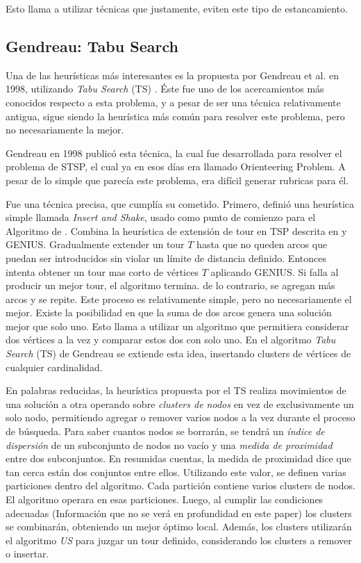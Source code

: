 \documentclass[letter, 10pt]{article}
\begin{document}
Esto llama a utilizar técnicas que justamente, eviten este tipo de estancamiento.


\subsection{Gendreau: Tabu Search}

Una de las heurísticas más interesantes es la propuesta por Gendreau et al. en 1998, utilizando \textit{Tabu Search} (TS) \cite{ProblemaTabu}. Éste fue uno de los acercamientos más conocidos respecto a esta problema, y a pesar de ser una técnica relativamente antigua, sigue siendo la heurística más común para resolver este problema, pero no necesariamente la mejor.

Gendreau en 1998 \cite{ProblemaTabu} publicó esta técnica, la cual fue desarrollada para resolver el problema de STSP, el cual ya en esos días era llamado Orienteering Problem. A pesar de lo simple que parecía este problema, era difícil generar rubricas para él. 

Fue una técnica precisa, que cumplía su cometido. Primero, definió una heurística simple llamada \textit{Insert and Shake}, usado como punto de comienzo para el Algoritmo de . Combina la heurística de extensión de tour en TSP descrita en \cite{ProblemaHerramientaParaTabuSearch} y GENIUS. Gradualmente extender un tour $T$ hasta que no queden arcos que puedan ser introducidos sin violar un límite de distancia definido. Entonces intenta obtener un tour mas corto de vértices $T$ aplicando GENIUS. Si falla al producir un mejor tour, el algoritmo termina. de lo contrario, se agregan más arcos y se repite. Este proceso es relativamente simple, pero no necesariamente el mejor. Existe la posibilidad en que la suma de dos arcos genera una solución mejor que solo uno. Esto llama a utilizar un algoritmo que permitiera considerar dos vértices a la vez y comparar estos dos con solo uno. En el algoritmo \textit{Tabu Search} (TS) de Gendreau se extiende esta idea, insertando clusters de vértices de cualquier cardinalidad.

En palabras reducidas, la heurística propuesta por el TS realiza movimientos de una solución a otra operando sobre \textit{clusters de nodos} en vez de exclusivamente un solo nodo, permitiendo agregar o remover varios nodos a la vez durante el proceso de búsqueda. Para saber cuantos nodos se borrarán, se tendrá un \textit{índice de dispersión} de un subconjunto de nodos no vacío y una \textit{medida de proximidad} entre dos subconjuntos. En resumidas cuentas, la medida de proximidad dice que tan cerca están dos conjuntos entre ellos. Utilizando este valor, se definen varias particiones dentro del algoritmo. Cada partición contiene varios clusters de nodos. El algoritmo operara en esas particiones. Luego, al cumplir las condiciones adecuadas (Información que no se verá en profundidad en este paper) los clusters se combinarán, obteniendo un mejor óptimo local. Además, los clusters utilizarán el algoritmo \textit{US} para juzgar un tour definido, considerando los clusters a remover o insertar. 
\end{document}
